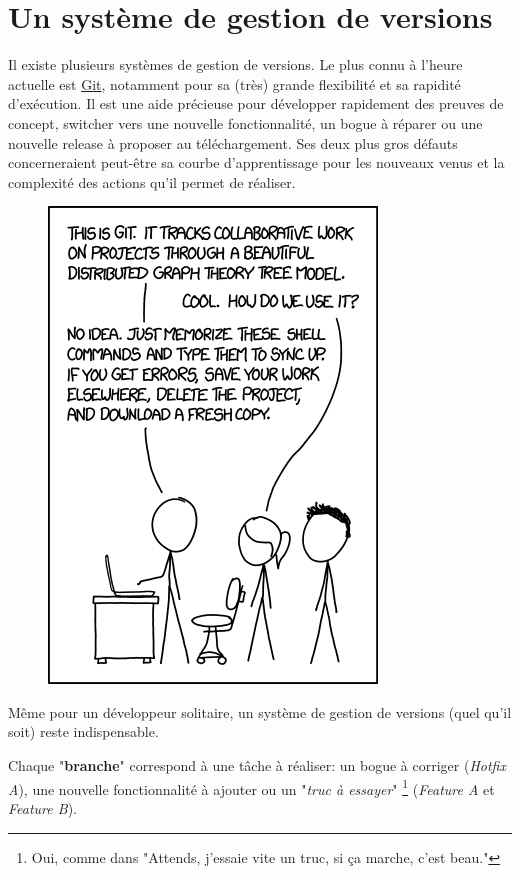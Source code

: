 \documentclass[11pt]{amsbook}
\begin{document}
\hypertarget{x-un-système-de-gestion-de-versions}{\section{Un système de gestion de versions}}
Il existe plusieurs systèmes de gestion de versions.
Le plus connu à l’heure actuelle est \href{https://git-scm.com/}{Git}, notamment pour sa (très) grande flexibilité et sa rapidité d’exécution.
Il est une aide précieuse pour développer rapidement des preuves de concept, switcher vers une nouvelle fonctionnalité, un bogue à réparer ou une nouvelle release à proposer au téléchargement.
Ses deux plus gros défauts concerneraient peut-être sa courbe d’apprentissage pour les nouveaux venus et la complexité des actions qu’il permet de réaliser.


\begin{figure}[h]{}
\centering\includegraphics[width=2.5truein]{images/xkcd-1597-git.png}
\caption{}

\end{figure}

Même pour un développeur solitaire, un système de gestion de versions (quel qu’il soit) reste indispensable.


Chaque "\textbf{branche}" correspond à une tâche à réaliser: un bogue à corriger (\emph{Hotfix A}), une nouvelle fonctionnalité à ajouter ou un "\emph{truc à essayer}" \footnote{Oui, comme dans "Attends, j’essaie vite un truc, si ça marche, c’est beau."} (\emph{Feature A} et \emph{Feature B}).
\end{document}
